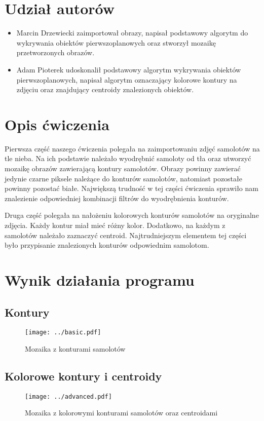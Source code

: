 \documentclass{article}
\begin{document}


\section*{Udział autorów}
\begin{itemize}
\item Marcin Drzewiecki zaimportował obrazy, napisał podstawowy algorytm do wykrywania obiektów pierwszoplanowych oraz stworzył mozaikę przetworzonych obrazów.
\item Adam Pioterek udoskonalił podstawowy algorytm wykrywania obiektów pierwszoplanowych, napisał algorytm oznaczający kolorowe kontury na zdjęciu oraz znajdujący centroidy znalezionych obiektów.
\end{itemize}

\section{Opis ćwiczenia}
Pierwsza część naszego ćwiczenia polegała na zaimportowaniu zdjęć samolotów na tle nieba.
Na ich podstawie należało wyodrębnić samoloty od tła oraz utworzyć mozaikę obrazów zawierającą kontury samolotów. 
Obrazy powinny zawierać jedynie czarne piksele należące do konturów samolotów, natomiast pozostałe powinny pozostać białe.
Największą trudność w tej części ćwiczenia sprawiło nam znalezienie odpowiedniej kombinacji filtrów do wyodrębnienia konturów.

Druga część polegała na nałożeniu kolorowych konturów samolotów na oryginalne zdjęcia.
Każdy kontur miał mieć różny kolor.
Dodatkowo, na każdym z samolotów należało zaznaczyć centroid.
Najtrudniejszym elementem tej części było przypisanie znalezionych konturów odpowiednim samolotom.
 
\section{Wynik działania programu}

\subsection{Kontury}
\begin{figure}[H]
\begin{center}
\texttt{[image: ../basic.pdf]}
\end{center}
\caption{Mozaika z konturami samolotów}
\label{fig: wykres1}
\end{figure}

\subsection{Kolorowe kontury i centroidy}
\begin{figure}[H]
\begin{center}
\texttt{[image: ../advanced.pdf]}
\end{center}
\caption{Mozaika z kolorowymi konturami samolotów oraz centroidami}
\label{fig: wykres2}
\end{figure}
\end{document}
